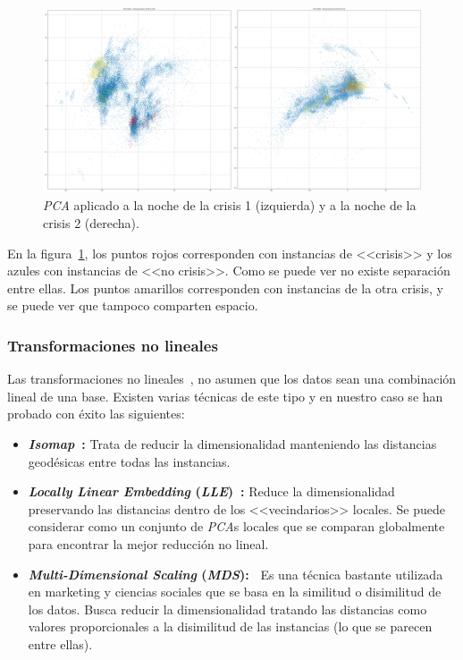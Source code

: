 \begin{figure}[H]
	\centering
	\includegraphics[width=1\textwidth]{../img/pca.png}
	\caption[Ejemplo de \textit{PCA}.] {\textit{PCA} aplicado a la noche de la crisis 1 (izquierda) y a la noche de la crisis 2 (derecha).}
	\label{fig:pca}
\end{figure}

En la figura~\ref{fig:pca}, los puntos rojos corresponden con instancias de <<crisis>> y los azules con instancias de <<no crisis>>. Como se puede ver no existe separación entre ellas. Los puntos amarillos corresponden con instancias de la otra crisis, y se puede ver que tampoco comparten espacio. 

\subsubsection{Transformaciones no lineales}

Las transformaciones no lineales~\cite{manifold}, no asumen que los datos sean una combinación lineal de una base. Existen varias técnicas de este tipo y en nuestro caso se han probado con éxito las siguientes: 

\begin{itemize}
	\item \textbf{\textit{Isomap}~\cite{isomap}:} Trata de reducir la dimensionalidad manteniendo las distancias geodésicas entre todas las instancias.
	\item \textbf{\textit{Locally Linear Embedding} (\textit{LLE})~\cite{lle}:} Reduce la dimensionalidad preservando las distancias dentro de los <<vecindarios>> locales. Se puede considerar como un conjunto de \textit{PCA}s locales que se comparan globalmente para encontrar la mejor reducción no lineal. 
	\item \textbf{\textit{Multi-Dimensional Scaling} (\textit{MDS}):~\cite{mds}} Es una técnica bastante utilizada en marketing y ciencias sociales que se basa en la similitud o disimilitud de los datos. Busca reducir la dimensionalidad tratando las distancias como valores proporcionales a la disimilitud de las instancias (lo que se parecen entre ellas).   
\end{itemize}

